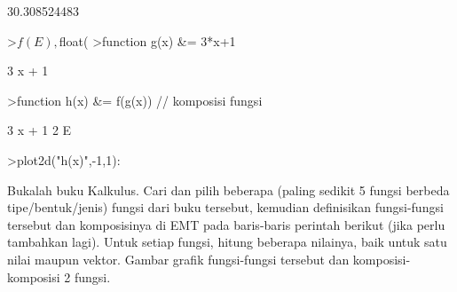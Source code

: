 \documentclass[a4paper,10pt]{article}
\begin{document}
\begin{eulernotebook}
\begin{eulercomment}
\begin{eulercomment}
\begin{eulercomment}
\begin{eulercomment}
\begin{eulercomment}
\begin{eulercomment}
\begin{eulercomment}
\begin{eulercomment}
\begin{eulercomment}
\begin{eulercomment}
\begin{eulercomment}
\begin{eulercomment}
\begin{euleroutput}
\end{euleroutput}
\begin{euleroutput}
  30.308524483
\end{euleroutput}
\begin{eulerprompt}
>$f(E), $float(%
>function g(x) &= 3*x+1
\end{eulerprompt}
\begin{euleroutput}
  
                                 3 x + 1
  
\end{euleroutput}
\begin{eulerprompt}
>function h(x) &= f(g(x)) // komposisi fungsi
\end{eulerprompt}
\begin{euleroutput}
  
                                   3 x + 1
                                2 E
  
\end{euleroutput}
\begin{eulerprompt}
>plot2d("h(x)",-1,1):
\end{eulerprompt}
\begin{eulercomment}
Bukalah buku Kalkulus. Cari dan pilih beberapa (paling sedikit 5 fungsi berbeda
tipe/bentuk/jenis) fungsi dari buku tersebut, kemudian definisikan fungsi-fungsi tersebut dan
komposisinya di EMT pada baris-baris perintah berikut (jika perlu tambahkan lagi). Untuk setiap
fungsi, hitung beberapa nilainya, baik untuk satu nilai maupun vektor. Gambar grafik
fungsi-fungsi tersebut dan komposisi-komposisi 2 fungsi.


\end{eulercomment}
\end{eulercomment}
\end{eulercomment}
\end{eulercomment}
\end{eulercomment}
\end{eulercomment}
\end{eulercomment}
\end{eulercomment}
\end{eulercomment}
\end{eulercomment}
\end{eulercomment}
\end{eulercomment}
\end{eulercomment}
\end{eulernotebook}
\end{document}
